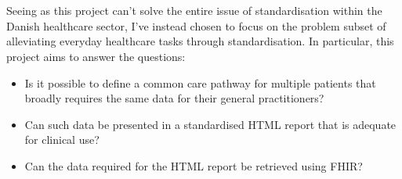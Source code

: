 \\
\\
Seeing as this project can't solve the entire issue of standardisation within the Danish healthcare sector, I've instead chosen to focus on the problem subset of alleviating everyday healthcare tasks through standardisation. In particular, this project aims to answer the questions:
\begin{itemize}
    \item Is it possible to define a common care pathway for multiple patients that broadly requires the same data for their general practitioners?
    \item Can such data be presented in a standardised HTML report that is adequate for clinical use?
    \item Can the data required for the HTML report be retrieved using FHIR?
\end{itemize}   

